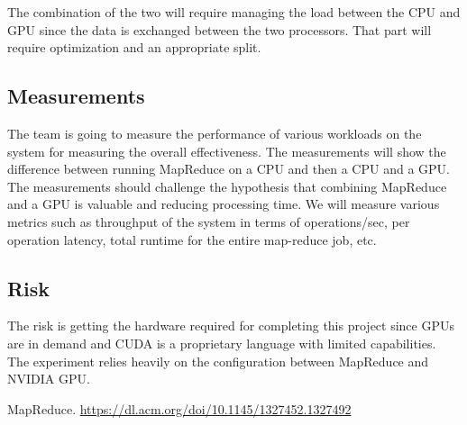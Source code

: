 \documentclass{article}
\begin{document}
The combination of the two will require managing the load between the CPU and GPU since the data is exchanged between the two processors. That part will require optimization and an appropriate split.

\subsection{Measurements}
The team is going to measure the performance of various workloads on the system for measuring the overall effectiveness. The measurements will show the difference between running MapReduce on a CPU and then a CPU and a GPU. The measurements should challenge the hypothesis that combining MapReduce and a GPU is valuable and reducing processing time. We will measure various metrics such as throughput of the system in terms of operations/sec, per operation latency, total runtime for the entire map-reduce job, etc.

\subsection{Risk}
The risk is getting the hardware required for completing this project since GPUs are in demand and CUDA is a proprietary language with limited capabilities. The experiment relies heavily on the configuration between MapReduce and NVIDIA GPU. 

\begin{thebibliography}{}
\raggedright

MapReduce.
\href{https://dl.acm.org/doi/10.1145/1327452.1327492}{https://dl.acm.org/doi/10.1145/1327452.1327492}

\end{thebibliography}
\end{document}
